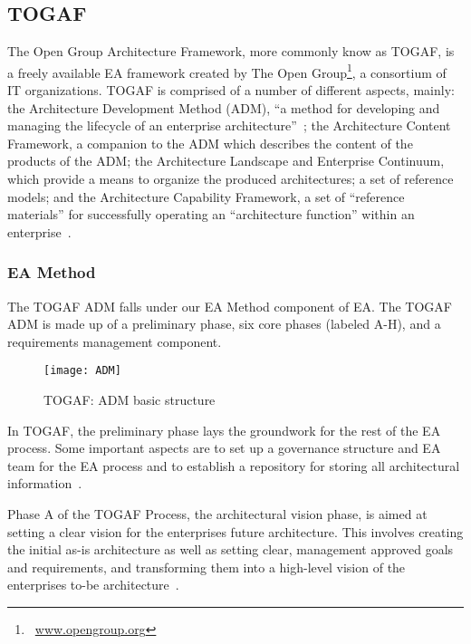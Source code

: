 \subsection{TOGAF}
The Open Group Architecture Framework, more commonly know as TOGAF, is a freely available EA framework created by The Open Group\footnote{~\url{www.opengroup.org}}, a consortium of IT organizations. TOGAF is comprised of a number of different aspects, mainly: the Architecture Development Method (ADM), ``a method for developing and managing the lifecycle of an enterprise architecture''~\cite[Ch. 5.1]{togaf9.1}; the Architecture Content Framework, a companion to the ADM which describes the content of the products of the ADM; the Architecture Landscape and Enterprise Continuum, which provide a means to organize the produced architectures; a set of reference models; and the Architecture Capability Framework, a set of ``reference materials'' for successfully operating an ``architecture function'' within an enterprise~\cite[Ch. 45]{togaf9.1}. 

%
%


\subsubsection{EA Method}
The TOGAF ADM falls under our EA Method component of EA. The TOGAF ADM is made up of a preliminary phase, six core phases (labeled A-H), and a requirements management component. 

\begin{figure}
\texttt{[image: ADM]}
\caption[TOGAF: ADM basic structure]{TOGAF: ADM basic structure \cite[Sec. 5.2.2]{togaf9.1}}
\label{fig:ADM}
\end{figure}

In TOGAF, the preliminary phase lays the groundwork for the rest of the EA process. Some important aspects are to set up a governance structure and EA team for the EA process and to establish a repository for storing all architectural information~\cite[Ch. 6]{togaf9.1}.

Phase A of the TOGAF Process, the architectural vision phase, is aimed at setting a clear vision for the enterprises future architecture. This involves creating the initial as-is architecture as well as setting clear, management approved goals and requirements, and transforming them into a high-level vision of the enterprises to-be architecture~\cite[Ch. 7]{togaf9.1}.

